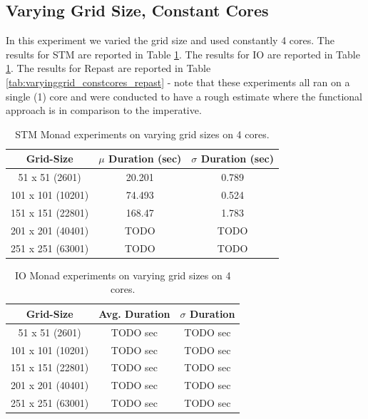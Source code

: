 \subsection{Varying Grid Size, Constant Cores}
In this experiment we varied the grid size and used constantly 4 cores. The results for STM are reported in Table \ref{tab:varyinggrid_constcores_stm}. The results for IO are reported in Table \ref{tab:varyinggrid_constcores_stm}. The results for Repast are reported in Table \ref{tab:varyinggrid_constcores_repast} - note that these experiments all ran on a single (1) core and were conducted to have a rough estimate where the functional approach is in comparison to the imperative.

\begin{table}
	\centering
  	\begin{tabular}{ c || c | c }
        Grid-Size         & $\mu$ Duration (sec) & $\sigma$ Duration (sec) \\ \hline \hline 
   		51 x 51 (2601)    & 20.201               & 0.789 \\ \hline
   		101 x 101 (10201) & 74.493               & 0.524 \\ \hline
   		151 x 151 (22801) & 168.47               & 1.783 \\ \hline
   		201 x 201 (40401) & TODO                 & TODO \\ \hline 
   		251 x 251 (63001) & TODO                 & TODO \\ \hline
  	\end{tabular}
  	
  	\caption{STM Monad experiments on varying grid sizes on 4 cores.}
	\label{tab:varyinggrid_constcores_stm}
\end{table}

\begin{table}
	\centering
  	\begin{tabular}{ c || c | c }
        Grid-Size         & Avg. Duration & $\sigma$ Duration \\ \hline \hline 
   		51 x 51   (2601)  & TODO sec & TODO sec \\ \hline
   		101 x 101 (10201) & TODO sec & TODO sec \\ \hline
   		151 x 151 (22801) & TODO sec & TODO sec \\ \hline
   		201 x 201 (40401) & TODO sec & TODO sec \\ \hline 
   		251 x 251 (63001) & TODO sec & TODO sec \\ \hline 
  	\end{tabular}
  	
  	\caption{IO Monad experiments on varying grid sizes on 4 cores.}
	\label{tab:varyinggrid_constcores_IO}
\end{table}

